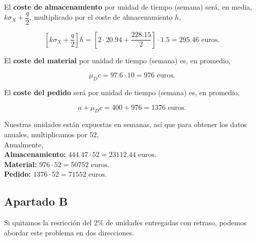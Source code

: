 \documentclass[a4paper,12pt]{article}
\begin{document}

El \textbf{coste de almacenamiento} por unidad de tiempo (semana) ser\'a, en media, $k\sigma_X + \dfrac{q}{2}$, multiplicado por el coste de almacenamiento $h$,

$$ \left[k\sigma_X + \dfrac{q}{2}\right] h = \left[2\cdot 20.94 + \dfrac{228.15}{2} \right]\cdot 1.5 = 295.46\text{ euros.}$$

El \textbf{coste del material} por unidad de tiempo (semana) es, en promedio,

$$ \mu_D c = 97.6\cdot 10 = 976 \text{ euros.}$$

El \textbf{coste del pedido} ser\'a por unidad de tiempo (semana) es, en promedio,

$$ a + \mu_D c = 400 + 976 = 1376 \text{ euros.}$$

Nuestras unidades est\'an expuestas en semanas, as\'i que para obtener los datos anuales, multiplicamos por $52$,\\

Anualmente,\\


\textbf{Almacenamiento:} $444.47\cdot 52 =  23112.44 \text{ euros.}$\\
\textbf{Material:} $976\cdot 52 = 50752\text{ euros.}$\\
\textbf{Pedido:} $1376\cdot 52 = 71552\text{ euros.}$\\



\pagebreak

\subsection{Apartado B}

Si quitamos la resricci\'on del 2\% de unidades entregadas con retraso, podemos abordar este problema en dos direcciones.
\end{document}
